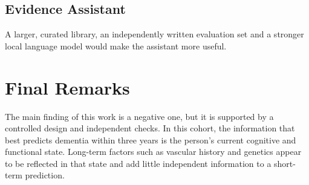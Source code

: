 \subsection{Evidence Assistant}
A larger, curated library, an independently written evaluation set and a stronger local language model would make the assistant more useful.

\section{Final Remarks}
The main finding of this work is a negative one, but it is supported by a controlled design and independent checks. In this cohort, the information that best predicts dementia within three years is the person's current cognitive and functional state. Long-term factors such as vascular history and genetics appear to be reflected in that state and add little independent information to a short-term prediction.
